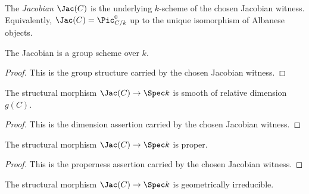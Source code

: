 \begin{definition}[Jacobian]
  \label{def:Jacobian}
  The \emph{Jacobian} \(\Jac(C)\) is the underlying \(k\)-scheme of the
  chosen Jacobian witness.  Equivalently, \(\Jac(C)=\Pic^0_{C/k}\) up to the
  unique isomorphism of Albanese objects.
\end{definition}

\begin{theorem}
  \label{thm:Jacobian_grpObj}
  The Jacobian is a group scheme over \(k\).
\end{theorem}

\begin{proof}
  This is the group structure carried by the chosen Jacobian witness.
\end{proof}

\begin{theorem}
  \label{thm:Jacobian_smooth_genus}
  The structural morphism \(\Jac(C)\to\Spec k\) is smooth of relative
  dimension \(g(C)\).
\end{theorem}

\begin{proof}
  This is the dimension assertion carried by the chosen Jacobian witness.
\end{proof}

\begin{theorem}[Properness]
  \label{thm:Jacobian_proper}
  The structural morphism \(\Jac(C)\to\Spec k\) is proper.
\end{theorem}

\begin{proof}
  This is the properness assertion carried by the chosen Jacobian witness.
\end{proof}

\begin{theorem}
  \label{thm:Jacobian_geomIrred}
  The structural morphism \(\Jac(C)\to\Spec k\) is geometrically irreducible.
\end{theorem}

